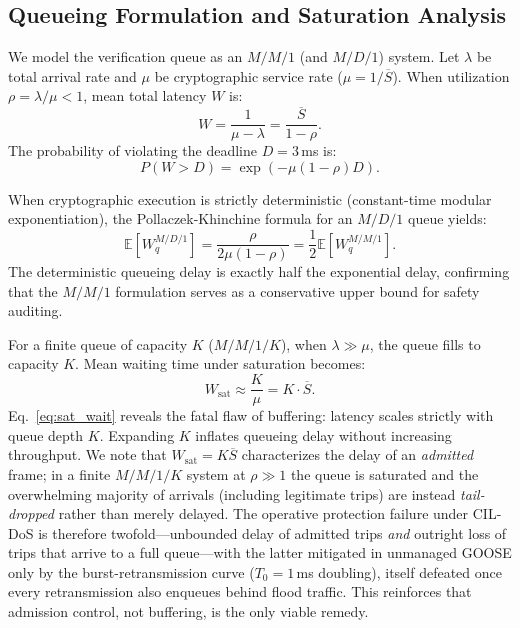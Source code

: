 \documentclass[journal]{IEEEtran}
\begin{document}
\subsection{Queueing Formulation and Saturation Analysis}
We model the verification queue as an $M/M/1$ (and $M/D/1$) system. Let $\lambda$ be total arrival rate and $\mu$ be cryptographic service rate ($\mu = 1/\overline{S}$). When utilization $\rho = \lambda/\mu < 1$, mean total latency $W$ is:
\begin{equation}
W = \frac{1}{\mu - \lambda} = \frac{\overline{S}}{1 - \rho}.
\end{equation}
The probability of violating the deadline $D = 3$\,ms is:
\begin{equation}
P(W > D) = \exp\left(-\mu(1 - \rho) D\right).
\end{equation}

When cryptographic execution is strictly deterministic (constant-time modular exponentiation), the Pollaczek-Khinchine formula for an $M/D/1$ queue yields:
\begin{equation}
\mathbb{E}[W_q^{M/D/1}] = \frac{\rho}{2\mu(1-\rho)} = \frac{1}{2} \mathbb{E}[W_q^{M/M/1}].
\end{equation}
The deterministic queueing delay is exactly half the exponential delay, confirming that the $M/M/1$ formulation serves as a conservative upper bound for safety auditing.

For a finite queue of capacity $K$ ($M/M/1/K$), when $\lambda \gg \mu$, the queue fills to capacity $K$. Mean waiting time under saturation becomes:
\begin{equation}
W_{\text{sat}} \approx \frac{K}{\mu} = K \cdot \overline{S}.
\label{eq:sat_wait}
\end{equation}
Eq.~\eqref{eq:sat_wait} reveals the fatal flaw of buffering: latency scales strictly with queue depth $K$. Expanding $K$ inflates queueing delay without increasing throughput. We note that $W_{\text{sat}} = K\overline{S}$ characterizes the delay of an \emph{admitted} frame; in a finite $M/M/1/K$ system at $\rho \gg 1$ the queue is saturated and the overwhelming majority of arrivals (including legitimate trips) are instead \emph{tail-dropped} rather than merely delayed. The operative protection failure under CIL-DoS is therefore twofold---unbounded delay of admitted trips \emph{and} outright loss of trips that arrive to a full queue---with the latter mitigated in unmanaged GOOSE only by the burst-retransmission curve ($T_0=1$\,ms doubling), itself defeated once every retransmission also enqueues behind flood traffic. This reinforces that admission control, not buffering, is the only viable remedy.
\end{document}
